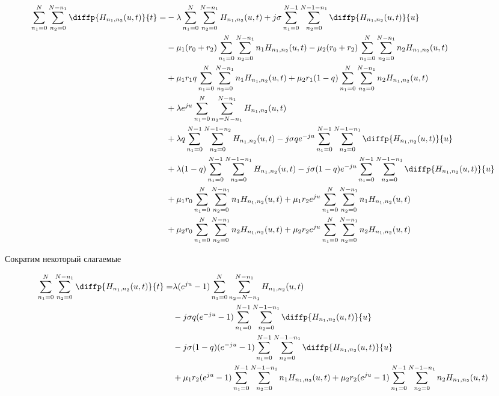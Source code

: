 \begin{equation*}
\begin{aligned}
	\sum_{n_1=0}^N\sum_{n_2=0}^{N-n_1} \diffp{H_{n_1,n_2}(u,t)}{t}=
	&-\lambda \sum_{n_1=0}^N\sum_{n_2=0}^{N-n_1} H_{n_1, n_2}(u,t)
	 +j\sigma \sum_{n_1=0}^{N-1}\sum_{n_2=0}^{N-1-n_1} 
	 \diffp{H_{n_1, n_2}(u,t)}{u}\\
	&-\mu_1 (r_0+r_2) \sum_{n_1=0}^N\sum_{n_2=0}^{N-n_1} n_1 H_{n_1, n_2}(u,t)
	 -\mu_2 (r_0+r_2)\sum_{n_1=0}^N\sum_{n_2=0}^{N-n_1} n_2 H_{n_1, n_2}(u,t)\\
	&+\mu_1 r_1 q \sum_{n_1=0}^N\sum_{n_2=0}^{N-n_1} n_1 H_{n_1, n_2}(u,t)
	 +\mu_2 r_1 (1-q)\sum_{n_1=0}^N\sum_{n_2=0}^{N-n_1} n_2 H_{n_1, n_2}(u,t)\\
	&+\lambda e^{ju}\sum_{n_1=0}^N\sum_{n_2=N-n_1}^{N-n_1} 
	  H_{n_1, n_2}(u,t)\\
	&+\lambda q \sum_{n_1=0}^{N-1}\sum_{n_2=0}^{N-1-n_2} 
	  H_{n_1, n_2}(u,t)
	 -j \sigma q e^{-ju} \sum_{n_1=0}^{N-1}\sum_{n_2=0}^{N-1-n_1} 
	   \diffp{H_{n_1, n_2}(u,t)}{u}\\
	&+\lambda (1-q) \sum_{n_1=0}^{N-1}\sum_{n_2=0}^{N-1-n_1} 
	  H_{n_1, n_2}(u,t) 
	 -j \sigma (1-q) e^{-ju}\sum_{n_1=0}^{N-1}\sum_{n_2=0}^{N-1-n_1} 
	  \diffp{H_{n_1, n_2}(u,t)}{u}\\
	&+\mu_1 r_0 \sum_{n_1=0}^N\sum_{n_2=0}^{N-n_1} 
	  n_1 H_{n_1, n_2}(u,t)
	+\mu_1 r_2 e^{ju}\sum_{n_1=0}^{N}\sum_{n_2=0}^{N-n_1} 
	  n_1 H_{n_1, n_2}(u,t)\\
	&+\mu_2 r_0 \sum_{n_1=0}^N\sum_{n_2=0}^{N-n_1} 
	  n_2 H_{n_1, n_2}(u,t)
	 +\mu_2 r_2 e^{ju}\sum_{n_1=0}^{N}\sum_{n_2=0}^{N-n_1} 
	  n_2 H_{n_1, n_2}(u,t)\\
\end{aligned}
\end{equation*}

Сократим некоторый слагаемые 

\begin{equation*}
\begin{aligned}
	\sum_{n_1=0}^N\sum_{n_2=0}^{N-n_1} \diffp{H_{n_1,n_2}(u,t)}{t}=
	&\lambda (e^{ju} - 1)\sum_{n_1=0}^N\sum_{n_2=N-n_1}^{N-n_1} 
	  H_{n_1, n_2}(u,t)\\
	&-j \sigma q (e^{-ju}-1) \sum_{n_1=0}^{N-1}\sum_{n_2=0}^{N-1-n_1} 
	   \diffp{H_{n_1, n_2}(u,t)}{u}\\
	&-j \sigma (1-q) (e^{-ju}-1)\sum_{n_1=0}^{N-1}\sum_{n_2=0}^{N-1-n_1} 
	  \diffp{H_{n_1, n_2}(u,t)}{u}\\
	&+\mu_1 r_2 (e^{ju} -1)\sum_{n_1=0}^{N-1}\sum_{n_2=0}^{N-1-n_1} 
	n_1 H_{n_1, n_2}(u,t)
	+\mu_2 r_2 (e^{ju} -1)\sum_{n_1=0}^{N-1}\sum_{n_2=0}^{N-1-n_1} 
	n_2 H_{n_1, n_2}(u,t)\\
\end{aligned}
\end{equation*}

